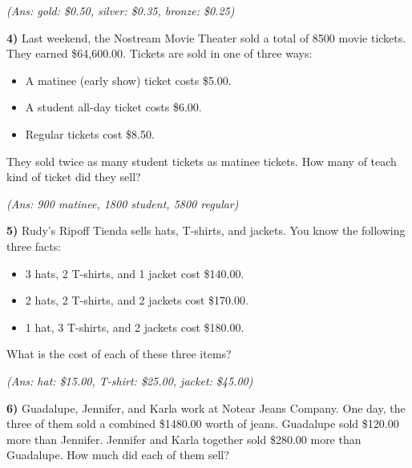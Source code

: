 \documentclass[10pt,letterpaper]{memoir}
\begin{document}
\myWideMatrixTable[-0.1in]

\vspace{0.5in}
\hfill{\itshape (Ans: gold: \$0.50, silver: \$0.35, bronze: \$0.25)}
\vspace{2em}





{\bfseries\large 4)} 
Last weekend, the Nostream Movie Theater sold a total of 8500 movie tickets.
They earned \$64,600.00.
Tickets are sold in one of three ways:
\begin{itemize}
    \item A matinee (early show) ticket costs \$5.00.
    \item A student all-day ticket costs \$6.00.
    \item Regular tickets cost \$8.50.
\end{itemize}
They sold twice as many student tickets as matinee tickets.
How many of teach kind of ticket did they sell?

\myWideMatrixTable[-0.1in]

\vspace{0.5in}
\hfill{\itshape (Ans: 900 matinee, 1800 student, 5800 regular)}
\vspace{2em}




\newpage
{\bfseries\large 5)} 
Rudy's Ripoff Tienda sells hats, T-shirts, and jackets. 
You know the following three facts:
\begin{itemize}[itemsep=0in]
    \item 3 hats, 2 T-shirts, and 1 jacket cost \$140.00.
    \item 2 hats, 2 T-shirts, and 2 jackets cost \$170.00.
    \item 1 hat, 3 T-shirts, and 2 jackets cost \$180.00.
\end{itemize}
What is the cost of each of these three items?

\myWideMatrixTable[-0.1in]

\vspace{0.5in}
\hfill{\itshape (Ans: hat: \$15.00, T-shirt: \$25.00, jacket: \$45.00)}
\vspace{2em}



{\bfseries\large 6)} 
Guadalupe, Jennifer, and Karla work at Notear Jeans Company.
One day, the three of them sold a combined \$1480.00 worth of jeans.
Guadalupe sold \$120.00 more than Jennifer.
Jennifer and Karla together sold \$280.00 more than Guadalupe.
How much did each of them sell?
\end{document}
